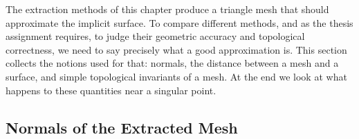 \documentclass[12pt, a4paper, oneside]{book}
\theoremstyle{plain}
\newtheorem{theorem}{Theorem}[chapter]
\theoremstyle{definition}
\theoremstyle{remark}
\theoremstyle{definition}
\begin{document}

\label{sec:poly-quality}

The extraction methods of this chapter produce a triangle mesh that should approximate the implicit surface. To compare different methods, and as the thesis assignment requires, to judge their geometric accuracy and topological correctness, we need to say precisely what a good approximation is. This section collects the notions used for that: normals, the distance between a mesh and a surface, and simple topological invariants of a mesh. At the end we look at what happens to these quantities near a singular point.

\subsection{Normals of the Extracted Mesh}
\end{document}
